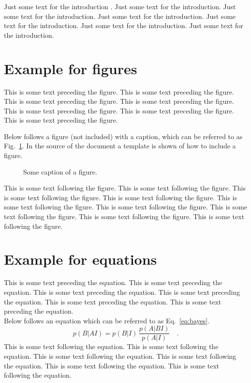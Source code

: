 \documentclass[a4paper,11pt,twocolumn,pdftex]{nveart}
\begin{document}
Just some text for the introduction \cite{pdg}. Just some text for the introduction. Just some text for the introduction.
Just some text for the introduction. Just some text for the introduction. Just some text for the introduction.
Just some text for the introduction.

\section{Example for figures}
This is some text preceding the figure. This is some text preceding the figure.
This is some text preceding the figure. This is some text preceding the figure.
This is some text preceding the figure. This is some text preceding the figure.
This is some text preceding the figure.

Below follows a figure (not included) with a caption, which can be referred to
as Fig.~\ref{fig:jet}. In the source of the document a template is shown
of how to include a figure.

\begin{figure}[htb]
\begin{center}
\end{center}
\caption{Some caption of a figure.}
\label{fig:jet}
\end{figure}

This is some text following the figure. This is some text following the figure.
This is some text following the figure. This is some text following the figure.
This is some text following the figure. This is some text following the figure.
This is some text following the figure. This is some text following the figure.
This is some text following the figure.

\section{Example for equations}
This is some text preceding the equation. This is some text preceding the equation.
This is some text preceding the equation. This is some text preceding the equation.
This is some text preceding the equation. This is some text preceding the equation.\\
Below follows an equation which can be referred to as Eq.~\eqref{eq:bayes}.
%
\begin{equation}
p(B|AI)=p(B|I)\,\frac{p(A|BI)}{p(A|I)} \quad .
\label{eq:bayes}
\end{equation}
%
This is some text following the equation. This is some text following the equation.
This is some text following the equation. This is some text following the equation.
This is some text following the equation. This is some text following the equation.
\end{document}
